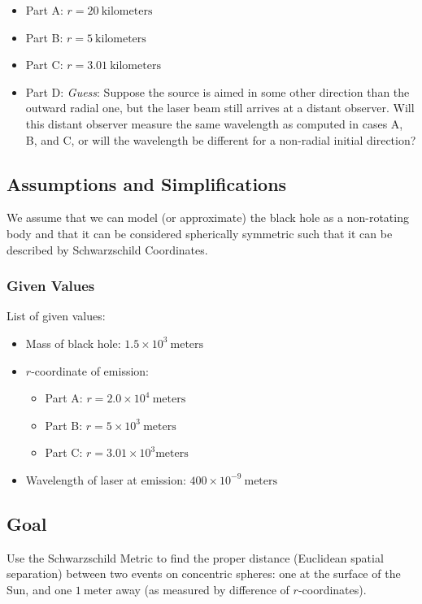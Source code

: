 \documentclass[]{report}
\begin{document}
        \begin{itemize}
          \item Part A: $r=20\ \text{kilometers}$
          \item Part B: $r=5\ \text{kilometers}$
          \item Part C: $r=3.01\ \text{kilometers}$
          \item Part D: \emph{Guess}: Suppose the source is aimed in some other direction than the outward radial one, but the laser beam still arrives at a distant observer. Will this distant observer measure the same wavelength as computed in cases A, B, and C, or will the wavelength be different for a non-radial initial direction?
          \end{itemize}

      \subsection{Assumptions and Simplifications}
        We assume that we can model (or approximate) the black hole as a non-rotating body and that it can be considered spherically symmetric such that it can be described by Schwarzschild Coordinates.

        \subsubsection{Given Values}
          List of given values:
          \begin{itemize}
            \item Mass of black hole: $1.5\times10^3\ \text{meters}$
            \item $r$-coordinate of emission:
              \begin{itemize}
                \item Part A: $r=2.0\times10^4\ \text{meters}$
                \item Part B: $r=5\times10^3\ \text{meters}$
                \item Part C: $r=3.01\times10^3 \text{meters}$
                \end{itemize}
            \item Wavelength of laser at emission: $400\times10^{-9}\ \text{meters}$
            \end{itemize}

      \subsection{Goal}
        Use the Schwarzschild Metric to find the proper distance (Euclidean spatial separation) between two events on concentric spheres: one at the surface of the Sun, and one $1\ \text{meter}$ away (as measured by difference of $r$-coordinates).
\end{document}
